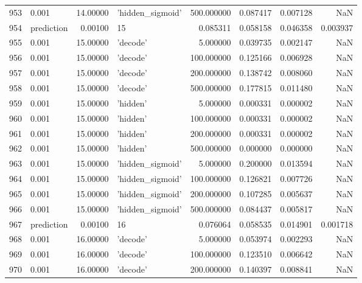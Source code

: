 \documentclass[10pt,a4paper]{article}
\begin{document}
\begin{tabular}{llrlrrrr}
953  &       0.001 &  14.00000 &   'hidden\_sigmoid' &  500.000000 &  0.087417 &  0.007128 &       NaN \\
954  &  prediction &   0.00100 &                 15 &    0.085311 &  0.058158 &  0.046358 &  0.003937 \\
955  &       0.001 &  15.00000 &           'decode' &    5.000000 &  0.039735 &  0.002147 &       NaN \\
956  &       0.001 &  15.00000 &           'decode' &  100.000000 &  0.125166 &  0.006928 &       NaN \\
957  &       0.001 &  15.00000 &           'decode' &  200.000000 &  0.138742 &  0.008060 &       NaN \\
958  &       0.001 &  15.00000 &           'decode' &  500.000000 &  0.177815 &  0.011480 &       NaN \\
959  &       0.001 &  15.00000 &           'hidden' &    5.000000 &  0.000331 &  0.000002 &       NaN \\
960  &       0.001 &  15.00000 &           'hidden' &  100.000000 &  0.000331 &  0.000002 &       NaN \\
961  &       0.001 &  15.00000 &           'hidden' &  200.000000 &  0.000331 &  0.000002 &       NaN \\
962  &       0.001 &  15.00000 &           'hidden' &  500.000000 &  0.000000 &  0.000000 &       NaN \\
963  &       0.001 &  15.00000 &   'hidden\_sigmoid' &    5.000000 &  0.200000 &  0.013594 &       NaN \\
964  &       0.001 &  15.00000 &   'hidden\_sigmoid' &  100.000000 &  0.126821 &  0.007726 &       NaN \\
965  &       0.001 &  15.00000 &   'hidden\_sigmoid' &  200.000000 &  0.107285 &  0.005637 &       NaN \\
966  &       0.001 &  15.00000 &   'hidden\_sigmoid' &  500.000000 &  0.084437 &  0.005817 &       NaN \\
967  &  prediction &   0.00100 &                 16 &    0.076064 &  0.058535 &  0.014901 &  0.001718 \\
968  &       0.001 &  16.00000 &           'decode' &    5.000000 &  0.053974 &  0.002293 &       NaN \\
969  &       0.001 &  16.00000 &           'decode' &  100.000000 &  0.123510 &  0.006642 &       NaN \\
970  &       0.001 &  16.00000 &           'decode' &  200.000000 &  0.140397 &  0.008841 &       NaN \\

\end{tabular}
\end{document}
